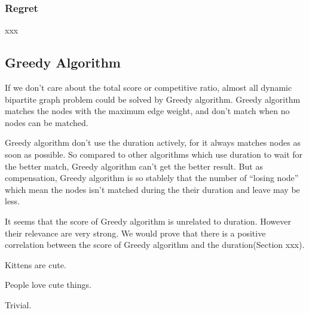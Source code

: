 \subsubsection{Regret}
xxx

\subsection{Greedy Algorithm}
\par If we don't care about the total score or competitive ratio, almost all dynamic bipartite graph problem could be solved by Greedy algorithm. Greedy algorithm matches the nodes with the maximum edge weight, and don't match when no nodes can be matched. 
\par  Greedy algorithm don't use the duration actively, for it always matches nodes as soon as possible. So compared to other algorithms which use duration to wait for the better match,  Greedy algorithm can't get the better result. But as compensation, Greedy algorithm is so stablely that the  number of  ``losing node'' which mean the nodes isn't matched during the their duration and leave may be less.
\par It seems that the score of Greedy algorithm is unrelated to duration. However their relevance are very strong. We would prove that there is a positive correlation between the score of Greedy algorithm and the duration(Section xxx).


\begin{property}
Kittens are cute.
\end{property}

\begin{lemma}
People love cute things.
\end{lemma}


\begin{IEEEproof}
Trivial.
\end{IEEEproof}


\begin{subequations}\label{opt:mcup}

\end{subequations}
